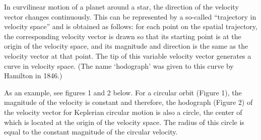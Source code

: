In curvilinear motion of a planet around a star, the direction of the velocity
vector changes continuously. This can be represented by a so-called
``trajectory in velocity space'' and is obtained as follows: for each point on
the spatial trajectory, the corresponding velocity vector is drawn so that its
starting point is at the origin of the velocity space, and its magnitude and
direction is the same as the velocity vector at that point. The tip of this
variable velocity vector generates a curve in velocity space. (The name
`hodograph' was given to this curve by Hamilton in 1846.)

As an example, see figures 1 and 2 below. For a circular orbit (Figure 1), the
magnitude of the velocity is constant and therefore, the hodograph (Figure 2)
of the velocity vector for Keplerian circular motion is also a circle, the
center of which is located at the origin of the velocity space. The radius of
this circle is equal to the constant magnitude of the circular velocity.



